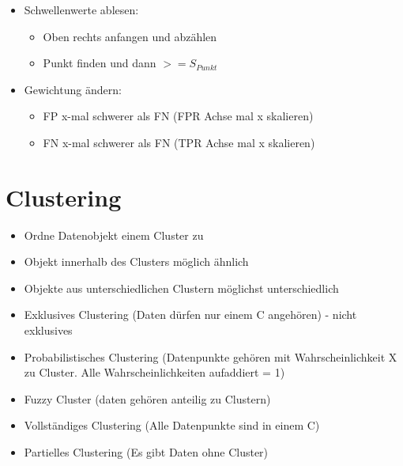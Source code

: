 \documentclass[a4paper]{article}
\begin{document}
\begin{landscape}
\begin{multicols}{3}
\begin{itemize}[noitemsep,nolistsep]
\begin{itemize}
                \end{itemize}
            \item Schwellenwerte ablesen:
            \begin{itemize}[noitemsep,nolistsep]
                \item Oben rechts anfangen und abzählen
                \item Punkt finden und dann $>= S_{Punkt}$
            \end{itemize}
            \item Gewichtung ändern:
            \begin{itemize}[noitemsep,nolistsep]
                \item FP x-mal schwerer als FN (FPR Achse mal x skalieren)
                \item FN x-mal schwerer als FN (TPR Achse mal x skalieren)
            \end{itemize}
        \end{itemize}

    \section{Clustering}
    \begin{itemize}[noitemsep,nolistsep]
        \item Ordne Datenobjekt einem Cluster zu 
        \item Objekt innerhalb des Clusters möglich ähnlich 
        \item Objekte aus unterschiedlichen Clustern möglichst unterschiedlich
        \item Exklusives Clustering (Daten dürfen nur einem C angehören) - nicht exklusives 
        \item Probabilistisches Clustering (Datenpunkte gehören mit Wahrscheinlichkeit X zu Cluster. Alle Wahrscheinlichkeiten aufaddiert = 1)
        \item Fuzzy Cluster (daten gehören anteilig zu Clustern)
        \item Vollständiges Clustering (Alle Datenpunkte sind in einem C)
        \item Partielles Clustering (Es gibt Daten ohne Cluster)
    \end{itemize}


\end{multicols}
\end{landscape}
\end{document}
